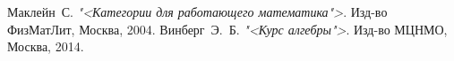 \begin{thebibliography}{0}
     Маклейн~С.
        \emph{"<Категории для работающего математика">}. Изд-во ФизМатЛит, Москва, 2004.
     Винберг~Э.~Б.
        \emph{"<Курс алгебры">}. Изд-во МЦНМО, Москва, 2014.
\end{thebibliography}